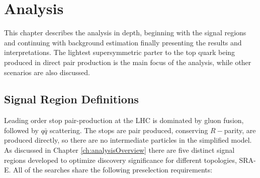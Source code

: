 \chapter{Analysis}
\label{ch:analysis}



This chapter describes the analysis in depth, beginning with the signal regions and continuing with background estimation finally presenting the results and interpretations.  The lightest supersymmetric parter to the top quark being produced in direct pair production is the main focus of the analysis, while other scenarios are also discussed.  


\section{Signal Region Definitions}

Leading order stop pair-production at the LHC is dominated by gluon fusion, followed by $q\bar{q}$ scattering.  The stops are pair produced, conserving $R-$parity, are produced directly, so there are no intermediate particles in the simplified model.  \\

As discussed in Chapter \ref{ch:analysisOverview} there are five distinct signal regions developed to optimize discovery significance for different topologies, SRA-E.  All of the searches share the following preselection requirements:

